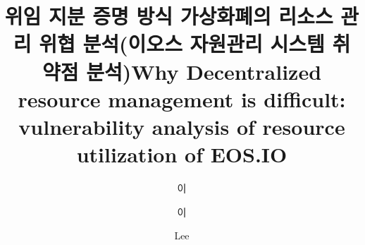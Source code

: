 \documentclass[master,english,final,pdfdoc]{kaist-ucs-improved}
\title[korean] {위임 지분 증명 방식 가상화폐의 리소스 관리 위협 분석(이오스 자원관리 시스템 취약점 분석)}
\title[english]{Why Decentralized resource management is difficult: vulnerability analysis of resource utilization of EOS.IO}
\author[korean]{이}{상 섭}
\author[korean2]{이}{상섭}    %
\author[chinese]{}{} %
\author[english]{Lee}{Sangsup}
\begin{document}
 


		\thesisinfo
   
   

		
		

    \addtocounter{pagemarker}{1}                 %
    \newpage  
  
		\iffinal
			\tableofcontents

			\listoftables

			\listoffigures
		\else
			\label{paperlastromanpagelabel} %
		\fi

\end{document}
